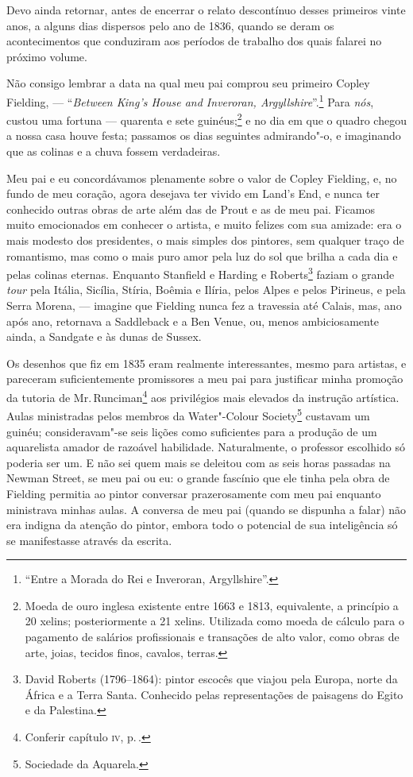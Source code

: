 Devo ainda retornar, antes de encerrar o relato descontínuo desses
primeiros vinte anos, a alguns dias dispersos pelo ano de 1836, quando
se deram os acontecimentos que conduziram aos períodos de trabalho dos
quais falarei no próximo volume.

Não consigo lembrar a data na qual meu pai comprou seu primeiro Copley
Fielding, --- ``\textit{Between King's House and Inveroran,
Argyllshire}''.\footnote{``Entre a Morada do Rei e Inveroran, Argyllshire''.} Para \textit{nós}, custou uma fortuna ---
quarenta e sete guinéus;\footnote{Moeda de ouro inglesa existente entre
  1663 e 1813, equivalente, a princípio a 20 xelins; posteriormente a 21
  xelins. Utilizada como moeda de cálculo para o pagamento de salários
  profissionais e transações de alto valor, como obras de arte, joias,
  tecidos finos, cavalos, terras.} e no dia em que o
quadro chegou a nossa casa houve festa; passamos os dias seguintes
admirando"-o, e imaginando que as colinas e a chuva fossem verdadeiras.

Meu pai e eu concordávamos plenamente sobre o valor de Copley Fielding,
e, no fundo de meu coração, agora desejava ter vivido em Land's End, e
nunca ter conhecido outras obras de arte além das de Prout e as de meu
pai. Ficamos muito emocionados em conhecer o artista, e muito felizes
com sua amizade: era o mais modesto dos presidentes, o mais simples dos
pintores, sem qualquer traço de romantismo, mas como o mais puro amor
pela luz do sol que brilha a cada dia e pelas colinas eternas. Enquanto
Stanfield e Harding e Roberts\footnote{David Roberts (1796--1864): pintor
  escocês que viajou pela Europa, norte da África e a Terra Santa.
  Conhecido pelas representações de paisagens do Egito e da Palestina.} faziam o grande \textit{tour} pela Itália, Sicília,
Stíria, Boêmia e Ilíria, pelos Alpes e pelos Pirineus, e pela Serra
Morena, --- imagine que Fielding nunca fez a travessia até Calais, mas,
ano após ano, retornava a Saddleback e a Ben Venue, ou, menos
ambiciosamente ainda, a Sandgate e às dunas de Sussex.

Os desenhos que fiz em 1835 eram realmente interessantes, mesmo
para artistas, e pareceram suficientemente promissores a meu pai para
justificar minha promoção da tutoria de Mr.\,Runciman\footnote{Conferir
  capítulo \textsc{iv}, p.\,\pageref{84}.} aos privilégios mais elevados da instrução
artística. Aulas ministradas pelos membros da Water"-Colour
Society\footnote{Sociedade da Aquarela.} custavam um
guinéu; consideravam"-se seis lições como suficientes para a produção de
um aquarelista amador de razoável habilidade. Naturalmente, o professor
escolhido só poderia ser um. E não sei quem mais se deleitou com as seis
horas passadas na Newman Street, se meu pai ou eu: o grande fascínio que
ele tinha pela obra de Fielding permitia ao pintor conversar
prazerosamente com meu pai enquanto ministrava minhas aulas. A conversa
de meu pai (quando se dispunha a falar) não era indigna da atenção do
pintor, embora todo o potencial de sua inteligência só se manifestasse
através da escrita.



